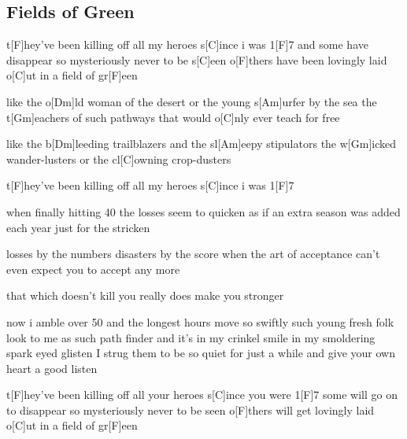 \subsection*{Fields of Green   }
\begin{guitar}
t[F]hey’ve been killing off all my heroes s[C]ince i was 1[F]7
and some have disappear so mysteriously never to be s[C]een
o[F]thers have been lovingly laid o[C]ut in a field of gr[F]een

like the o[Dm]ld woman of the desert
or the young s[Am]urfer by the sea
the t[Gm]eachers of such pathways
that would o[C]nly ever teach for free

like the b[Dm]leeding trailblazers
and the sl[Am]eepy stipulators
the w[Gm]icked wander-lusters
or the cl[C]owning crop-dusters

t[F]hey’ve been killing off all my heroes s[C]ince i was 1[F]7

when finally hitting 40
the losses seem to quicken
as if an extra season was added
each year just for the stricken

losses by the numbers
disasters by the score
when the art of acceptance
can't even expect you to accept any more

that which doesn't kill you really does make you stronger

now i amble over 50
and the longest hours move so swiftly
such young fresh folk
look to me as such path finder
and it's in my crinkel smile
in my smoldering spark eyed glisten
I strug them to be so quiet for just a while
and give your own heart a good listen

t[F]hey’ve been killing off all your heroes s[C]ince you were 1[F]7
some will go on to disappear so mysteriously never to be seen
o[F]thers will get lovingly laid o[C]ut in a field of gr[F]een
\end{guitar}
